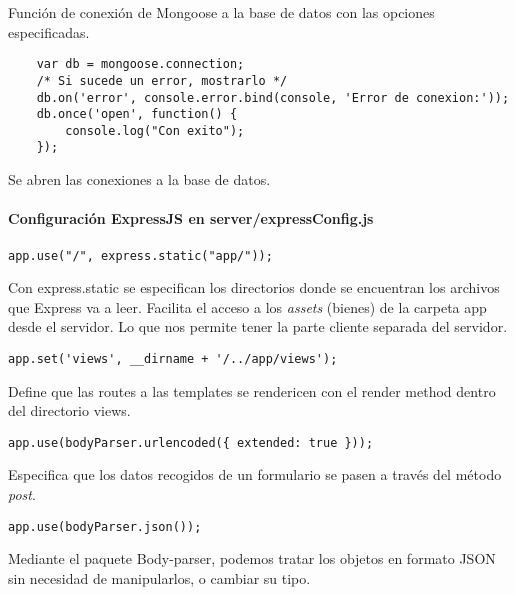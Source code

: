 Función de conexión de Mongoose a la base de datos con las opciones especificadas.



\medskip
\begin{lstlisting}
	var db = mongoose.connection;
	/* Si sucede un error, mostrarlo */
	db.on('error', console.error.bind(console, 'Error de conexion:'));
	db.once('open', function() {
		console.log("Con exito");
	});
\end{lstlisting}



Se abren las conexiones a la base de datos.


 
\paragraph*{Configuración ExpressJS en server/expressConfig.js}


\medskip
\begin{lstlisting}
app.use("/", express.static("app/"));
\end{lstlisting}


Con express.static se especifican los directorios donde se encuentran los archivos que Express va a leer. Facilita el acceso a los \textit{assets} (bienes) de la carpeta app desde el servidor. Lo que nos permite tener la parte cliente separada del servidor. 


\medskip
\begin{lstlisting}
app.set('views', __dirname + '/../app/views');
\end{lstlisting}


Define que las routes a las templates se rendericen con el render method dentro del directorio views.


\medskip
\begin{lstlisting}
app.use(bodyParser.urlencoded({ extended: true }));
\end{lstlisting}


Especifica que los datos recogidos de un formulario se pasen a través del método \textit{post}.


\medskip
\begin{lstlisting}
app.use(bodyParser.json());
\end{lstlisting}


Mediante el paquete Body-parser, podemos tratar los objetos en formato JSON sin necesidad de manipularlos, o cambiar su tipo.\newline

 
